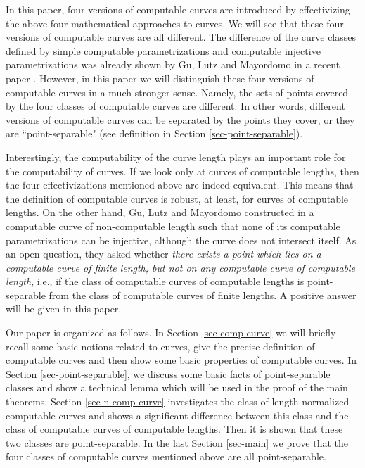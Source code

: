 \documentclass{LMCS}
\theoremstyle{plain}
\begin{document}
In this paper, four versions of computable curves are introduced by effectivizing the above four mathematical approaches to curves. We will see that these four versions of computable curves are all different. The difference of the curve classes defined by simple computable parametrizations and computable injective parametrizations was already shown by Gu, Lutz and Mayordomo in a recent paper \cite{GLM11}. However, in this paper we will distinguish these four versions of computable curves in a much stronger sense. Namely, the sets of points covered by the four classes of computable curves are different. In other words, different versions of computable curves can be separated by the points they cover, or they are ``point-separable" (see definition in Section \ref{sec-point-separable}).

Interestingly, the computability of the curve length plays an important role for the computability of curves. If we look only at curves of computable lengths, then the four effectivizations mentioned above are indeed equivalent. This means that the definition of computable curves is robust, at least, for curves of computable lengths.  On the other hand, Gu, Lutz and Mayordomo  constructed  in \cite{GLM11} a computable curve of non-computable length such that none of its computable parametrizations can be injective, although the curve does not intersect itself. As an open question, they asked whether {\em there exists a point which lies on a computable curve of finite length, but not on any computable curve of computable length}, i.e., if the class of computable curves of computable lengths is point-separable from the class of computable curves of finite lengths. A positive answer will be given in this paper.

Our paper is organized as follows. In Section \ref{sec-comp-curve} we will briefly recall some basic notions related to curves, give the precise definition of computable curves and then show some basic properties of computable curves. In Section \ref{sec-point-separable}, we discuss some basic facts of point-separable classes and show a technical lemma which will be used in the proof of the main theorems. Section \ref{sec-n-comp-curve} investigates the class of length-normalized computable curves and shows a significant difference between this class and the class of computable curves of computable lengths. Then it is shown that  these two  classes are point-separable. In the last Section \ref{sec-main} we prove that the four classes of computable curves mentioned above are all point-separable.
\end{document}
